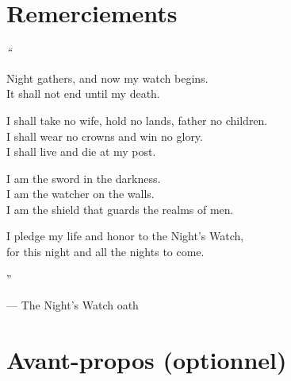 \documentclass{tnreport}
\begin{document}
\maketitle
{}


\cleardoublepage{}

\makesecondtitle{}

\section*{Remerciements}

{\em
``{Night gathers, and now my watch begins. \\
It shall not end until my death.

I shall take no wife, hold no lands, father no children. \\ I shall wear no
crowns and win no glory. \\ I shall live and die at my post.

I am the sword in the darkness. \\ I am the watcher on the walls. \\ I am the
shield that guards the realms of men.

I pledge my life and honor to the Night's Watch, \\ for this night and all the
nights to come.}''\/}

\hspace{4cm} --- The Night's Watch oath

\cleardoublepage{}

\section*{Avant-propos (optionnel)}

\cleardoublepage{}

\renewcommand{\baselinestretch}{0.5}\normalsize
\tableofcontents
\renewcommand{\baselinestretch}{1.0}\normalsize
\cleardoublepage{}

\setcounter{page}{1}
\end{document}
